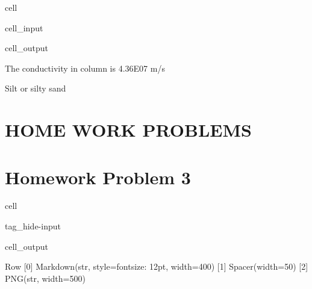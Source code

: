 \documentclass[letterpaper,10pt,english]{jupyterBook}
\begin{document}
\begin{sphinxuseclass}{cell}
\begin{sphinxVerbatimInput}
\begin{sphinxuseclass}{cell_input}
\end{sphinxuseclass}\end{sphinxVerbatimInput}
\begin{sphinxVerbatimOutput}

\begin{sphinxuseclass}{cell_output}
\begin{sphinxVerbatim}[commandchars=\\\{\}]
The conductivity in column is 4.36E\PYGZhy{}07 m/s 

Silt or silty sand
\end{sphinxVerbatim}

\end{sphinxuseclass}\end{sphinxVerbatimOutput}

\end{sphinxuseclass}

\section{HOME WORK PROBLEMS}
\label{\detokenize{content/tutorials/T3/tutorial_03:home-work-problems}}
\sphinxAtStartPar
{}

\sphinxAtStartPar
{}

\sphinxAtStartPar
{}


\section{Homework Problem 3}
\label{\detokenize{content/tutorials/T3/tutorial_03:homework-problem-3}}
\begin{sphinxuseclass}{cell}
\begin{sphinxuseclass}{tag_hide-input}\begin{sphinxVerbatimOutput}

\begin{sphinxuseclass}{cell_output}
\begin{sphinxVerbatim}[commandchars=\\\{\}]
Row
    [0] Markdown(str, style=\PYGZob{}\PYGZsq{}font\PYGZhy{}size\PYGZsq{}: \PYGZsq{}12pt\PYGZsq{}\PYGZcb{}, width=400)
    [1] Spacer(width=50)
    [2] PNG(str, width=500)
\end{sphinxVerbatim}

\end{sphinxuseclass}\end{sphinxVerbatimOutput}

\end{sphinxuseclass}
\end{sphinxuseclass}
\end{document}
